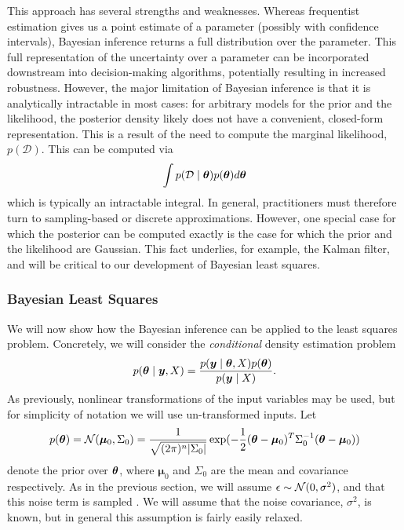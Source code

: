 This approach has several strengths and weaknesses. Whereas frequentist estimation gives us a point estimate of a parameter (possibly with confidence intervals), Bayesian inference returns a full distribution over the parameter. This full representation of the uncertainty over a parameter can be incorporated downstream into decision-making algorithms, potentially resulting in increased robustness. However, the major limitation of Bayesian inference is that it is analytically intractable in most cases: for arbitrary models for the prior and the likelihood, the posterior density likely does not have a convenient, closed-form representation. This is a result of the need to compute the marginal likelihood, $p(\mathcal{D})$. This can be computed via
\begin{equation}
    \int p(\mathcal{D}\mid\bm{\theta}) p(\bm{\theta}) d\bm{\theta}
\end{equation}
which is typically an intractable integral. In general, practitioners must therefore turn to sampling-based or discrete approximations. However, one special case for which the posterior can be computed exactly is the case for which the prior and the likelihood are Gaussian. This fact underlies, for example, the Kalman filter, and will be critical to our development of Bayesian least squares. 

\subsubsection{Bayesian Least Squares}

We will now show how the Bayesian inference can be applied to the least squares problem. Concretely, we will consider the \textit{conditional} density estimation problem
\begin{equation}
p(\bm{\theta}\mid \bm{y}, X) = \frac{p(\bm{y}\mid \bm{\theta}, X) p(\bm{\theta})}{p(\bm{y}\mid X)}.
\end{equation}
As previously, nonlinear transformations of the input variables may be used, but for simplicity of notation we will use un-transformed inputs. Let 
\begin{equation}
    p(\bm{\theta}) = \mathcal{N}(\bm{\mu}_0, \Sigma_0) = \frac{1}{\sqrt{(2 \pi)^{n} |\Sigma_0|}} \exp(-\frac{1}{2}(\bm{\theta} - \bm{\mu}_0)^T \Sigma_0^{-1} (\bm{\theta} - \bm{\mu}_0))
\end{equation}
denote the prior over $\bm{\theta}$, where $\bm{\mu}_0$ and $\Sigma_0$ are the mean and covariance respectively. As in the previous section, we will assume $\epsilon \sim \mathcal{N}(0, \sigma^2)$, and that this noise term is sampled \iid. We will assume that the noise covariance, $\sigma^2$, is known, but in general this assumption is fairly easily relaxed. 

